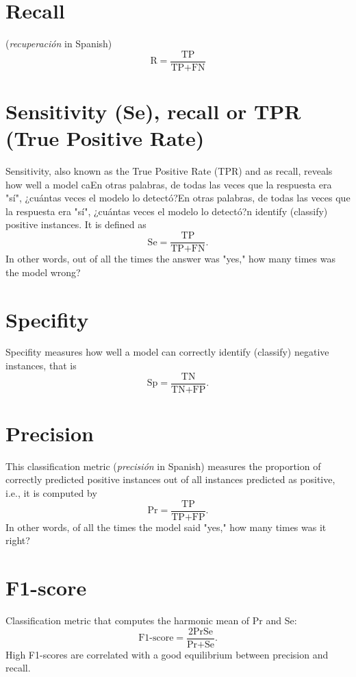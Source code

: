 \section{Recall}
(\emph{recuperación} in Spanish)
\begin{equation}
  \text{R} = \frac{\text{TP}}{\text{TP} + \text{FN}}
\end{equation}

\section{Sensitivity (Se), recall or TPR (True Positive Rate)}
Sensitivity, also known as the True Positive Rate (TPR) and as recall,
reveals how well a model caEn otras palabras, de todas las veces que la respuesta era "sí", ¿cuántas veces el modelo lo detectó?En otras palabras, de todas las veces que la respuesta era "sí", ¿cuántas veces el modelo lo detectó?n identify (classify) positive
instances. It is defined as
\begin{equation}
  \text{Se} = \frac{\text{TP}}{\text{TP} + \text{FN}}.
\end{equation}
In other words, out of all the times the answer was "yes," how many times was the model wrong?

\section{Specifity}
Specifity measures how well a model can correctly identify (classify)
negative instances, that is
\begin{equation}
  \text{Sp} = \frac{\text{TN}}{\text{TN} + \text{FP}}.
\end{equation}

\section{Precision}
This classification metric (\emph{precisión} in Spanish) measures the proportion of correctly predicted positive instances out of all instances predicted as positive, i.e., it is computed by
\begin{equation}
  \text{Pr} = \frac{\text{TP}}{\text{TP} + \text{FP}}.
\end{equation}
In other words, of all the times the model said "yes," how many times was it right?

\section{F1-score}
Classification metric that computes the harmonic mean of Pr and Se:
\begin{equation}
  \text{F1-score} = \frac{2\text{Pr}\text{Se}}{\text{Pr}+\text{Se}}.
\end{equation}
High F1-scores are correlated with a good equilibrium between precision and recall.

